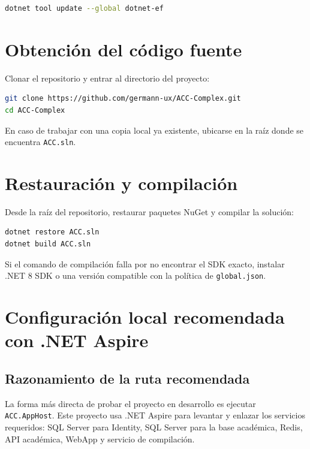 \documentclass[12pt,letterpaper]{article}
\begin{document}
\begin{lstlisting}[language=bash,caption={Actualizaci\'on de dotnet-ef.}]
dotnet tool update --global dotnet-ef
\end{lstlisting}

\section{Obtenci\'on del c\'odigo fuente}

Clonar el repositorio y entrar al directorio del proyecto:

\begin{lstlisting}[language=bash,caption={Clonado del repositorio.}]
git clone https://github.com/germann-ux/ACC-Complex.git
cd ACC-Complex
\end{lstlisting}

En caso de trabajar con una copia local ya existente, ubicarse en la ra\'iz donde se encuentra \texttt{ACC.sln}.

\section{Restauraci\'on y compilaci\'on}

Desde la ra\'iz del repositorio, restaurar paquetes NuGet y compilar la soluci\'on:

\begin{lstlisting}[language=bash,caption={Restauraci\'on y compilaci\'on de la soluci\'on.}]
dotnet restore ACC.sln
dotnet build ACC.sln
\end{lstlisting}

Si el comando de compilaci\'on falla por no encontrar el SDK exacto, instalar .NET 8 SDK o una versi\'on compatible con la pol\'itica de \texttt{global.json}.

\section{Configuraci\'on local recomendada con .NET Aspire}

\subsection{Razonamiento de la ruta recomendada}

La forma m\'as directa de probar el proyecto en desarrollo es ejecutar \texttt{ACC.AppHost}. Este proyecto usa .NET Aspire para levantar y enlazar los servicios requeridos: SQL Server para Identity, SQL Server para la base acad\'emica, Redis, API acad\'emica, WebApp y servicio de compilaci\'on.
\end{document}

